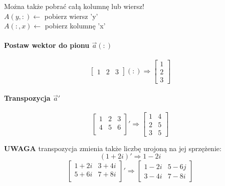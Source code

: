 \documentclass[16pt]{article}
\begin{document}
            Można także pobrać całą kolumnę lub wiersz!\\
            $A(y, :) \leftarrow$ pobierz wiersz 'y'\\
            $A(:, x) \leftarrow$ pobierz kolumnę 'x'\\
            


        \paragraph*{Postaw wektor do pionu $\vec{a}(:)$}
            \begin{equation*}
                \begin{bmatrix}
                    1 & 2 & 3
                \end{bmatrix}
                (:) \Rightarrow
                \begin{bmatrix}
                    1 \\ 2 \\ 3
                \end{bmatrix}
            \end{equation*}

        \paragraph*{Transpozycja $\vec{a}'$}
            \begin{equation*}
                \begin{bmatrix}
                    1 & 2 & 3\\
                    4 & 5 & 6\\ 
                \end{bmatrix}
                ' \Rightarrow
                \begin{bmatrix}
                    1 & 4\\
                    2 & 5\\
                    3 & 5
                \end{bmatrix}
            \end{equation*}

            \textbf{UWAGA} transpozycja zmienia także liczbę urojoną na jej sprzężenie:
            \begin{equation*}
                (1+2i)' \Rightarrow 1-2i
            \end{equation*}
            \begin{equation*}
                \begin{bmatrix}
                    1+2i & 3+4i\\
                    5+6i & 7+8i\\
                \end{bmatrix}
                \textbf{$'$}\Rightarrow
                \begin{bmatrix}
                    1-2i & 5-6j\\
                    3-4i & 7-8i
                \end{bmatrix}
            \end{equation*}
\end{document}

